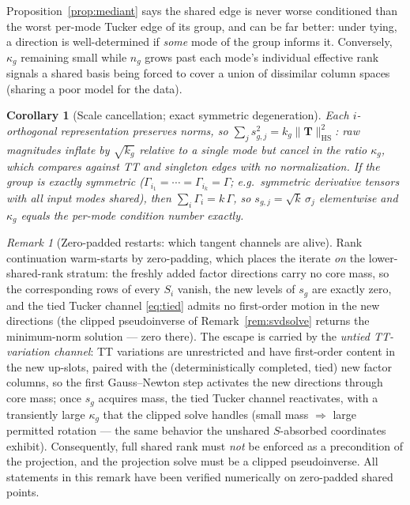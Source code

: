 \documentclass[11pt]{article}
\newtheorem{corollary}[theorem]{Corollary}
\theoremstyle{definition}
\theoremstyle{remark}
\newtheorem{remark}[theorem]{Remark}
\newcommand{\T}{\boldsymbol{T}}
\newcommand{\HS}{\mathrm{HS}}
\begin{document}
Proposition~\ref{prop:mediant} says the shared edge is never worse
conditioned than the worst per-mode Tucker edge of its group, and can be far
better: under tying, a direction is well-determined if \emph{some} mode of
the group informs it. Conversely, $\kappa_g$ remaining small while $n_g$
grows past each mode's individual effective rank signals a shared basis being
forced to cover a union of dissimilar column spaces (sharing a poor model for
the data).

\begin{corollary}[Scale cancellation; exact symmetric degeneration]
\label{cor:sym}
Each $i$-orthogonal representation preserves norms, so
$\sum_j s_{g,j}^2 = k_g \|\T\|_{\HS}^2$: raw magnitudes inflate by
$\sqrt{k_g}$ relative to a single mode but cancel in the ratio $\kappa_g$,
which compares against TT and singleton edges with no normalization. If the
group is exactly symmetric ($\Gamma_{i_1} = \cdots = \Gamma_{i_k} =
\Gamma$; e.g.\ symmetric derivative tensors with all input modes shared),
then $\sum_i \Gamma_i = k\,\Gamma$, so $s_{g,j} = \sqrt{k}\,\sigma_j$
elementwise and $\kappa_g$ equals the per-mode condition number exactly.
\end{corollary}

\begin{remark}[Zero-padded restarts: which tangent channels are alive]
\label{rem:restart}
Rank continuation warm-starts by zero-padding, which places the iterate
\emph{on} the lower-shared-rank stratum: the freshly added factor directions
carry no core mass, so the corresponding rows of every $S_i$ vanish, the new
levels of $s_g$ are exactly zero, and the tied Tucker channel
\eqref{eq:tied} admits no first-order motion in the new directions (the
clipped pseudoinverse of Remark~\ref{rem:svdsolve} returns the minimum-norm
solution --- zero there). The escape is carried by the \emph{untied
TT-variation channel}: TT variations are unrestricted and have first-order
content in the new up-slots, paired with the (deterministically completed,
tied) new factor columns, so the first Gauss--Newton step activates the new
directions through core mass; once $s_g$ acquires mass, the tied Tucker
channel reactivates, with a transiently large $\kappa_g$ that the clipped
solve handles (small mass $\Rightarrow$ large permitted rotation --- the
same behavior the unshared $S$-absorbed coordinates exhibit). Consequently,
full shared rank must \emph{not} be enforced as a precondition of the
projection, and the projection solve must be a clipped pseudoinverse. All
statements in this remark have been verified numerically on zero-padded
shared points.
\end{remark}
\end{document}
